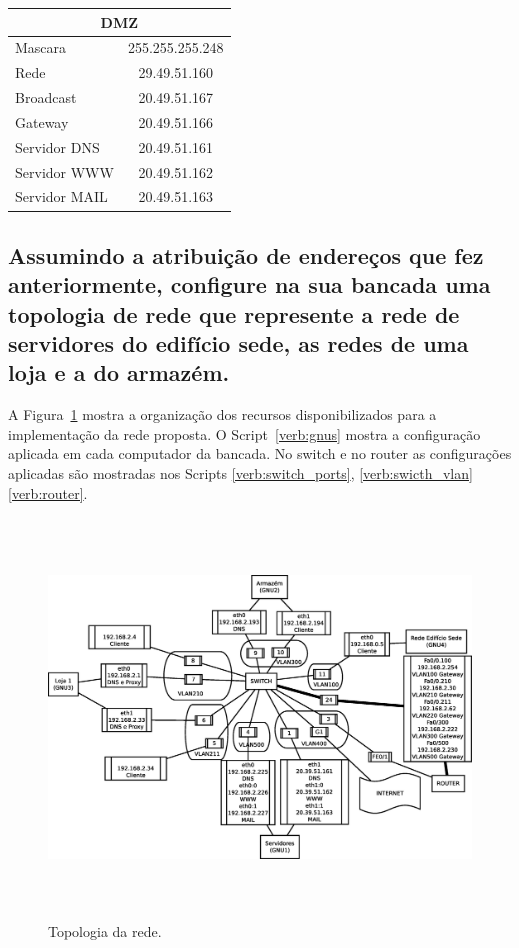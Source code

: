 \documentclass[a4paper,12pt]{article}
\begin{document}
\begin{center}
\begin{longtable}{ l | c }
   \multicolumn{2}{c}{DMZ} \\\hline 
   Mascara & 255.255.255.248 \\\hline
   Rede & 29.49.51.160 \\\hline 
   Broadcast & 20.49.51.167 \\\hline 
   Gateway & 20.49.51.166 \\\hline
   Servidor DNS & 20.49.51.161 \\\hline
   Servidor WWW & 20.49.51.162 \\\hline
   Servidor MAIL & 20.49.51.163 \\\hline
\end{longtable}
\end{center}

\subsection{Assumindo a atribuição de endereços que fez anteriormente, configure na sua
bancada uma topologia de rede que represente a rede de servidores do edifício
sede, as redes de uma loja e a do armazém.}

A Figura~\ref{fig:topologia} mostra a organização dos recursos disponibilizados
para a implementação da rede proposta. O Script~\ref{verb:gnus} mostra a configuração
aplicada em cada computador da bancada. No switch e no router as configurações
aplicadas são mostradas nos Scripts \ref{verb:switch_ports}, \ref{verb:swicth_vlan} \ref{verb:router}.

\begin{figure}[htp]
   \begin{center}
      \includegraphics[height=300pt]{topologia}
   \end{center}
   \caption{Topologia da rede.}
   \label{fig:topologia}
\end{figure}
\end{document}
